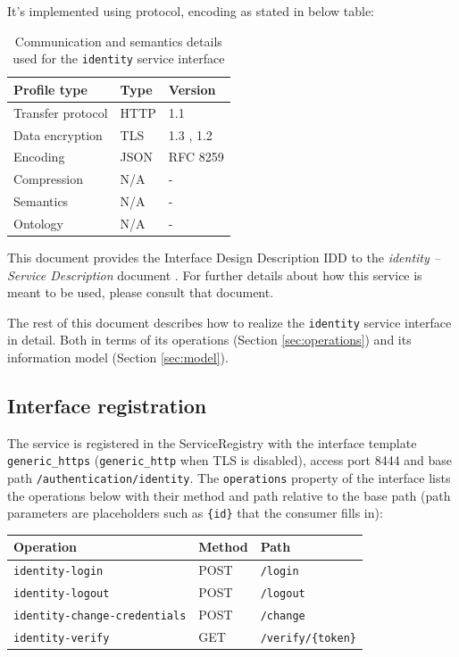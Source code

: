 \documentclass[a4paper]{arrowhead}
\begin{document}
It's implemented using protocol, encoding as stated in below table:
\begin{table}[ht!]
  \centering
  \begin{tabular}{|l|l|l|}
    \hline
    \rowcolor{gray!33} Profile type & Type & Version \\ \hline
    Transfer protocol & HTTP & 1.1 \cite{rfc9112} \\ \hline
    Data encryption & TLS & 1.3 \cite{rfc8446}, 1.2 \cite{rfc5246} \\ \hline
    Encoding & JSON & RFC 8259 \cite{rfc8259} \\ \hline
    Compression & N/A & - \\ \hline
    Semantics & N/A & - \\ \hline
    Ontology & N/A & - \\ \hline
  \end{tabular}
  \caption{Communication and semantics details used for the \texttt{identity} service interface}
  \label{tab:comunication_semantics_profile}
\end{table}

This document provides the Interface Design Description IDD to the \textit{identity -- Service Description} document \cite{auth-identity-sd}.
For further details about how this service is meant to be used, please consult that document.

The rest of this document describes how to realize the \texttt{identity} service
interface in detail. Both in terms of its operations (Section \ref{sec:operations}) and its information model (Section \ref{sec:model}).

\subsection{Interface registration}

The service is registered in the ServiceRegistry with the interface template \texttt{generic\_\allowbreak{}https} (\texttt{generic\_\allowbreak{}http} when TLS is disabled), access port 8444 and base path \texttt{/\allowbreak{}authentication/\allowbreak{}identity}. The \texttt{operations} property of the interface lists the operations below with their method and path relative to the base path (path parameters are placeholders such as \texttt{\{id\}} that the consumer fills in):

\noindent\begin{longtable}{| p{5.2cm} | p{1.6cm} | p{8.4cm} |} \hline
\rowcolor{gray!33} Operation & Method & Path \\ \hline \endhead
\texttt{identity-\allowbreak{}login} & POST & \texttt{/\allowbreak{}login} \\ \hline
\texttt{identity-\allowbreak{}logout} & POST & \texttt{/\allowbreak{}logout} \\ \hline
\texttt{identity-\allowbreak{}change-\allowbreak{}credentials} & POST & \texttt{/\allowbreak{}change} \\ \hline
\texttt{identity-\allowbreak{}verify} & GET & \texttt{/\allowbreak{}verify/\allowbreak{}\{token\}} \\ \hline
\end{longtable}
\end{document}
